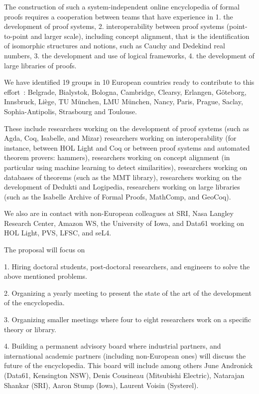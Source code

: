 The construction of such a system-independent online encyclopedia of formal proofs requires a cooperation between teams that have experience in
1. the development of proof systems,
2. interoperability between proof systems (point-to-point and larger scale), including concept alignment, that is the identification of isomorphic structures and notions, such as Cauchy and Dedekind real numbers,
3. the development and use of logical frameworks,
4. the development of large libraries of proofs.

We have identified 19 groups in 10 European countries ready to contribute to this effort : Belgrade, Bialystok, Bologna, Cambridge, Clearsy, Erlangen, G\"oteborg, Innsbruck, Liège, TU München, LMU München, Nancy, Paris, Prague, Saclay, Sophia-Antipolis, Strasbourg and Toulouse.

These include researchers working on the development of proof systems
(such as Agda, Coq, Isabelle, and Mizar) researchers working on
interoperability (for instance, between HOL Light and Coq or between
proof systems and automated theorem provers: hammers), researchers
working on concept alignment (in particular using machine learning to
detect similarities), researchers working on databases of theorems
(such as the MMT library), researchers working on the development of
Dedukti and Logipedia, researchers working on large libraries (such as
the Isabelle Archive of Formal Proofs, MathComp, and GeoCoq).


We also are in contact with non-European colleagues at SRI, Nasa
Langley Research Center, Amazon WS, the University of Iowa, and Data61
working on HOL Light, PVS, LFSC, and seL4.

The proposal will focus on

1. Hiring doctoral students, post-doctoral researchers, and engineers to solve the above mentioned problems.

2. Organizing a yearly meeting to present the state of the art of the development of the encyclopedia.

3. Organizing smaller meetings where four to eight researchers work on a specific theory or library.

4. Building a permanent advisory board where industrial partners, and
international academic partners (including non-European ones) will
discuss the future of the encyclopedia. This board will include among
others June Andronick (Data61, Kensington NSW), Denis Cousineau
(Mitsubishi Electric), Natarajan Shankar (SRI), Aaron Stump (Iowa),
Laurent Voisin (Systerel).

